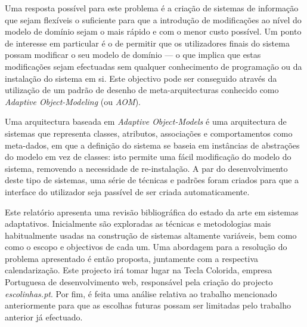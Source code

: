 Uma resposta possível para este problema é a criação de sistemas de informação que sejam flexíveis o suficiente para que a introdução de modificações ao nível do modelo de domínio sejam o mais rápido e com o menor custo possível. Um ponto de interesse em particular é o de permitir que os utilizadores finais do sistema possam modificar o seu modelo de domínio --- o que implica que estas modificações sejam efectuadas sem qualquer conhecimento de programação ou da instalação do sistema em si. Este objectivo pode ser conseguido através da utilização de um padrão de desenho de meta-arquitecturas conhecido como \textit{Adaptive Object-Modeling} (ou \textit{AOM}).

Uma arquitectura baseada em \textit{Adaptive Object-Models} é uma arquitectura de sistemas que representa classes, atributos, associações e comportamentos como meta-dados, em que a definição do sistema se baseia em instâncias de abstrações do modelo em vez de classes: isto permite uma fácil modificação do modelo do sistema, removendo a necessidade de re-instalação. A par do desenvolvimento deste tipo de sistemas, uma série de técnicas e padrões foram criados para que a interface do utilizador seja passível de ser criada automaticamente.

Este relatório apresenta uma revisão bibliográfica do estado da arte em sistemas adaptativos. Inicialmente são exploradas as técnicas e metodologias mais habitualmente usadas na construção de sistemas altamente variáveis, bem como como o escopo e objectivos de cada um. Uma abordagem para a resolução do problema apresentado é então proposta, juntamente com a respectiva calendarização. Este projecto irá tomar lugar na Tecla Colorida, empresa Portuguesa de desenvolvimento web, responsável pela criação do projecto \emph{escolinhas.pt}. Por fim, é feita uma análise relativa ao trabalho mencionado anteriormente para que as escolhas futuras possam ser limitadas pelo trabalho anterior já efectuado. 

